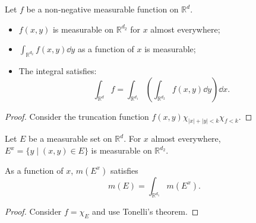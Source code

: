 \begin{theorem}
    Let $f$ be a non-negative measurable function on  $\mathbb{R}^{d}$.
	\begin{itemize}
		\item $f(x, y)$ is measurable on $\mathbb{R}^{d_2}$ for $x$ almost everywhere;
		\item  $\int_{\mathbb{R}^{d_2}}f(x,y)\dd y$ as a function of $x$
			is measurable;
		\item The integral satisfies:
			\[
			\int_{\mathbb{R}^{d}} f =\int _{\mathbb{R}^{d_1}}
			\left( \int_{\mathbb{R}^{d_2}} f(x,y)\dd y \right)\dd x.
			\]
	\end{itemize}
\end{theorem}
\begin{proof}[Proof]
    Consider the truncation function $f(x,y)\chi_{|x|+|y|<k}\chi_{f<k}$.
\end{proof}

\begin{proposition}
	Let $E$ be a measurable set on $\mathbb{R}^{d}$. For $x$ almost everywhere,
	$E^x = \{y \mid (x,y)\in E\}$ is measurable on $\mathbb{R}^{d_2}$.

	As a function of $x$,  $m(E^x)$ satisfies
	\[
	m(E) = \int_{\mathbb{R}^{d_1}}m(E^x).
	\]
\end{proposition}
\begin{proof}[Proof]
    Consider $f = \chi_{E}$ and use Tonelli's theorem.
\end{proof}
